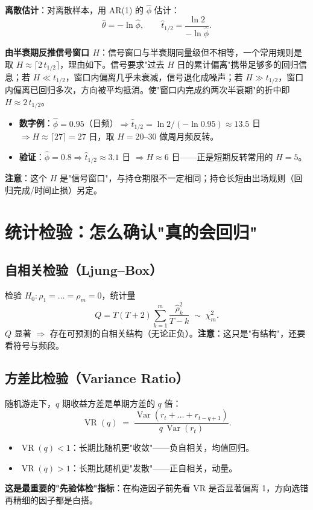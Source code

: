 \documentclass[UTF8,11pt]{ctexart}
\begin{document}
\textbf{离散估计}：对离散样本，用 AR(1) 的 $\hat\phi$ 估计：
\begin{equation}
\hat\theta = -\ln\hat\phi, \qquad \hat{t}_{1/2} = \frac{\ln 2}{-\ln\hat\phi}.
\end{equation}

\textbf{由半衰期反推信号窗口 $H$}：信号窗口与半衰期同量级但不相等，一个常用规则是取 $H \approx \lceil 2\,t_{1/2}\rceil$，理由如下。信号要求"过去 $H$ 日的累计偏离"携带足够多的回归信息；若 $H \ll t_{1/2}$，窗口内偏离几乎未衰减，信号退化成噪声；若 $H \gg t_{1/2}$，窗口内偏离已回归多次，方向被平均抵消。使"窗口内完成约两次半衰期"的折中即 $H \approx 2\,t_{1/2}$。
\begin{itemize}[itemsep=2pt]
\item \textbf{数字例}：$\hat\phi=0.95$（日频）$\Rightarrow \hat t_{1/2}=\ln2/(-\ln0.95)\approx13.5$ 日 $\Rightarrow H\approx\lceil27\rceil=27$ 日，取 $H=20$--$30$ 做周月频反转。
\item \textbf{验证}：$\hat\phi=0.8 \Rightarrow \hat t_{1/2}\approx3.1$ 日 $\Rightarrow H\approx6$ 日——正是短期反转常用的 $H=5$。
\end{itemize}
\textbf{注意}：这个 $H$ 是"信号窗口"，与持仓期限不一定相同；持仓长短由出场规则（回归完成/时间止损）另定。

\section{统计检验：怎么确认"真的会回归"}

\subsection{自相关检验（Ljung--Box）}
检验 $H_0:\rho_1=\dots=\rho_m=0$，统计量
\begin{equation}
Q = T(T+2)\sum_{k=1}^{m}\frac{\hat\rho_k^2}{T-k} \;\sim\; \chi^2_m.
\end{equation}
$Q$ 显著 $\Rightarrow$ 存在可预测的自相关结构（无论正负）。\textbf{注意}：这只是"有结构"，还要看符号与频段。

\subsection{方差比检验（Variance Ratio）}
随机游走下，$q$ 期收益方差是单期方差的 $q$ 倍：
\begin{equation}
\operatorname{VR}(q) \;=\; \frac{\operatorname{Var}(r_t+\dots+r_{t-q+1})}{q\,\operatorname{Var}(r_t)}.
\end{equation}
\begin{itemize}[itemsep=2pt]
\item $\operatorname{VR}(q) < 1$：长期比随机更"收敛"——负自相关，均值回归。
\item $\operatorname{VR}(q) > 1$：长期比随机更"发散"——正自相关，动量。
\end{itemize}
\textbf{这是最重要的"先验体检"指标}：在构造因子前先看 VR 是否显著偏离 1，方向选错再精细的因子都是白搭。
\end{document}

